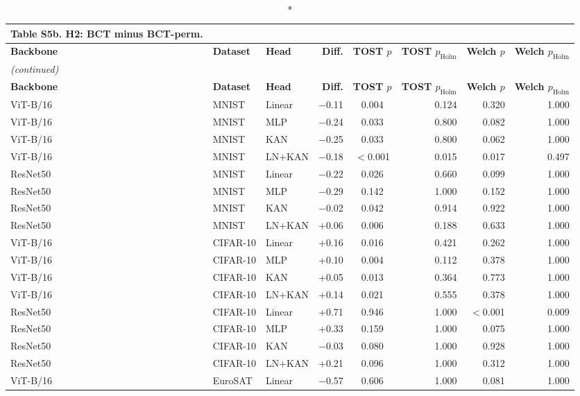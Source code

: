 \documentclass[10pt]{article}
\begin{document}
\scriptsize
\setlength{\tabcolsep}{3pt}
\begin{longtable}{lllrcrrr}
\caption*{\textbf{Table S5b.} H2: BCT minus BCT-perm.}\\
\toprule
\textbf{Backbone} & \textbf{Dataset} & \textbf{Head} & \textbf{Diff.} & \textbf{TOST $p$} & \textbf{TOST $p_{\mathrm{Holm}}$} & \textbf{Welch $p$} & \textbf{Welch $p_{\mathrm{Holm}}$} \\
\midrule
\endfirsthead
\multicolumn{8}{l}{\textit{(continued)}}\\
\toprule
\textbf{Backbone} & \textbf{Dataset} & \textbf{Head} & \textbf{Diff.} & \textbf{TOST $p$} & \textbf{TOST $p_{\mathrm{Holm}}$} & \textbf{Welch $p$} & \textbf{Welch $p_{\mathrm{Holm}}$} \\
\midrule
\endhead
\bottomrule
\endfoot
ViT-B/16 & MNIST & Linear & $-$0.11 & 0.004 & 0.124 & 0.320 & 1.000 \\
ViT-B/16 & MNIST & MLP & $-$0.24 & 0.033 & 0.800 & 0.082 & 1.000 \\
ViT-B/16 & MNIST & KAN & $-$0.25 & 0.033 & 0.800 & 0.062 & 1.000 \\
ViT-B/16 & MNIST & LN+KAN & $-$0.18 & $<$0.001 & 0.015 & 0.017 & 0.497 \\
ResNet50 & MNIST & Linear & $-$0.22 & 0.026 & 0.660 & 0.099 & 1.000 \\
ResNet50 & MNIST & MLP & $-$0.29 & 0.142 & 1.000 & 0.152 & 1.000 \\
ResNet50 & MNIST & KAN & $-$0.02 & 0.042 & 0.914 & 0.922 & 1.000 \\
ResNet50 & MNIST & LN+KAN & +0.06 & 0.006 & 0.188 & 0.633 & 1.000 \\
ViT-B/16 & CIFAR-10 & Linear & +0.16 & 0.016 & 0.421 & 0.262 & 1.000 \\
ViT-B/16 & CIFAR-10 & MLP & +0.10 & 0.004 & 0.112 & 0.378 & 1.000 \\
ViT-B/16 & CIFAR-10 & KAN & +0.05 & 0.013 & 0.364 & 0.773 & 1.000 \\
ViT-B/16 & CIFAR-10 & LN+KAN & +0.14 & 0.021 & 0.555 & 0.378 & 1.000 \\
ResNet50 & CIFAR-10 & Linear & +0.71 & 0.946 & 1.000 & $<$0.001 & 0.009 \\
ResNet50 & CIFAR-10 & MLP & +0.33 & 0.159 & 1.000 & 0.075 & 1.000 \\
ResNet50 & CIFAR-10 & KAN & $-$0.03 & 0.080 & 1.000 & 0.928 & 1.000 \\
ResNet50 & CIFAR-10 & LN+KAN & +0.21 & 0.096 & 1.000 & 0.312 & 1.000 \\
ViT-B/16 & EuroSAT & Linear & $-$0.57 & 0.606 & 1.000 & 0.081 & 1.000 \\

\end{longtable}
\end{document}
